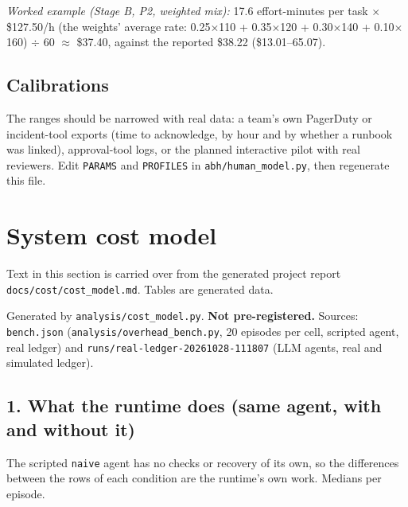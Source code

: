 \documentclass[letterpaper,twocolumn,10pt]{article}
\begin{document}
\emph{Worked example (Stage B, P2, weighted mix):} 17.6 effort-minutes per task $\times$ \$127.50/h (the weights' average rate: 0.25$\times$110 + 0.35$\times$120 + 0.30$\times$140 + 0.10$\times$160) $\div$ 60 $\approx$ \$37.40, against the reported \$38.22 (\$13.01--65.07).

\subsection*{Calibrations}

The ranges should be narrowed with real data: a team's own PagerDuty or incident-tool exports (time to acknowledge, by hour and by whether a runbook was linked), approval-tool logs, or the planned interactive pilot with real reviewers. Edit \texttt{PARAMS} and \texttt{PROFILES} in \texttt{abh/human\_model.py}, then regenerate this file.

\section{System cost model}\label{sec:S5}

Text in this section is carried over from the generated project report \texttt{docs/cost/cost\_model.md}. Tables are generated data.

Generated by \texttt{analysis/cost\_model.py}. \textbf{Not pre-registered.} Sources: \texttt{bench.json} (\texttt{analysis/overhead\_bench.py}, 20 episodes per cell, scripted agent, real ledger) and \texttt{runs/real-ledger-20261028-111807} (LLM agents, real and simulated ledger).

\subsection*{1. What the runtime does (same agent, with and without it)}

The scripted \texttt{naive} agent has no checks or recovery of its own, so the differences between the rows of each condition are the runtime's own work. Medians per episode.
\end{document}
